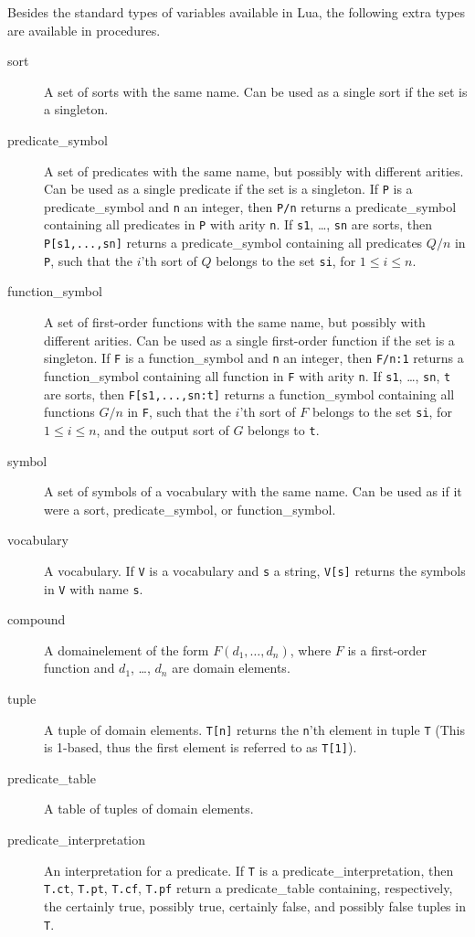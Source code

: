 Besides the standard types of variables available in Lua, the following extra types are available in \idp procedures.
\begin{description}
	\item[sort] A set of sorts with the same name. Can be used as a single sort if the set is a singleton.
	\item[predicate\_symbol] A set of predicates with the same name, but possibly with different arities. Can be used as a single predicate if the set is a singleton. If {\tt P} is a predicate\_symbol and {\tt n} an integer, then {\tt P/n} returns a predicate\_symbol containing all predicates in {\tt P} with arity {\tt n}. If {\tt s1}, \ldots, {\tt sn} are sorts, then {\tt P[s1,...,sn]} returns a predicate\_symbol containing all predicates $Q/n$ in {\tt P}, such that the $i$'th sort of $Q$ belongs to the set {\tt si}, for $1 \leq i \leq n$.
	\item[function\_symbol] A set of first-order functions with the same name, but possibly with different arities. Can be used as a single first-order function if the set is a singleton. If {\tt F} is a function\_symbol and {\tt n} an integer, then {\tt F/n:1} returns a function\_symbol containing all function in {\tt F} with arity {\tt n}. If {\tt s1}, \ldots, {\tt sn}, {\tt t} are sorts, then {\tt F[s1,...,sn:t]} returns a function\_symbol containing all functions $G/n$ in {\tt F}, such that the $i$'th sort of $F$ belongs to the set {\tt si}, for $1 \leq i \leq n$, and the output sort of $G$ belongs to {\tt t}.
	\item[symbol] A set of symbols of a vocabulary with the same name. Can be used as if it were a sort, predicate\_symbol, or function\_symbol.
	\item[vocabulary] A vocabulary. If {\tt V} is a vocabulary and {\tt s} a string, {\tt V[s]} returns the symbols in {\tt V} with name {\tt s}. 
	\item[compound] A domainelement of the form $F(d_1,\ldots,d_n)$, where $F$ is a first-order function and $d_1$, \ldots, $d_n$ are domain elements.
	\item[tuple] A tuple of domain elements. {\tt T[n]} returns the {\tt n}'th element in tuple {\tt T} (This is 1-based, thus the first element is referred to as {\tt T[1]}).
	\item[predicate\_table] A table of tuples of domain elements.
	\item[predicate\_interpretation] An interpretation for a predicate. If {\tt T} is a predicate\_interpretation, then {\tt T.ct}, {\tt T.pt}, {\tt T.cf}, {\tt T.pf} return a predicate\_table containing, respectively, the certainly true, possibly true, certainly false, and possibly false tuples in {\tt T}. %

\end{description}
